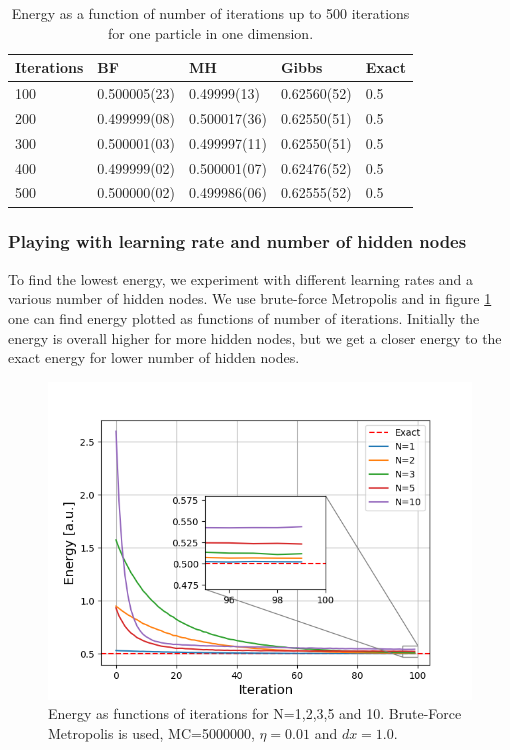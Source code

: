 \documentclass[norsk,a4paper,12pt]{article}
\begin{document}
\begin{table} [H]
	\caption{Energy as a function of number of iterations up to 500 iterations for one particle in one dimension. \vspace{2mm}}
	\begin{tabularx}{\textwidth}{X|XXXX} \hline\hline
		\label{tab:energies1P1D}
		Iterations & BF & MH & Gibbs & Exact \\ \hline
				100 & 0.500005(23) & 0.49999(13) & 0.62560(52) & 0.5 \\
				200 & 0.499999(08) & 0.500017(36) & 0.62550(51) & 0.5 \\
				300 & 0.500001(03) & 0.499997(11) & 0.62550(51) & 0.5 \\
				400 & 0.499999(02) & 0.500001(07) & 0.62476(52) & 0.5 \\
				500 & 0.500000(02) & 0.499986(06) & 0.62555(52) & 0.5 \\ \hline
	\end{tabularx}
\end{table}

\subsubsection{Playing with learning rate and number of hidden nodes}
To find the lowest energy, we experiment with different learning rates and a various number of hidden nodes. We use brute-force Metropolis and in figure \ref{fig:compare_nodes} one can find energy plotted as  functions of number of iterations. Initially the energy is overall higher for more hidden nodes, but we get a closer energy to the exact energy for lower number of hidden nodes. 

 \begin{figure} [H]
 	\centering
 	\includegraphics[scale=0.8]{plots/energy_compare_nodes.png}
 	\caption{Energy as functions of iterations for N=1,2,3,5 and 10. Brute-Force Metropolis is used, MC=5000000, $\eta=0.01$ and $dx=1.0$.}
 	\label{fig:compare_nodes}
 \end{figure}
 
\end{document}
